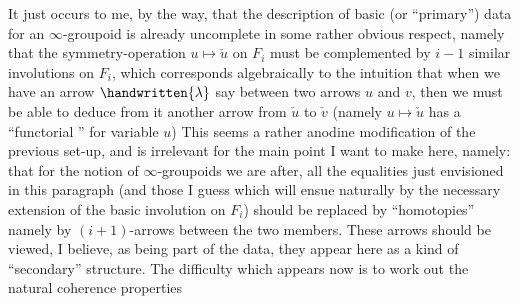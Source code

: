 It just occurs to me, by the way, that the  description of basic (or ``primary'') data for an $\infty$-groupoid is already uncomplete in some rather obvious respect, namely that the symmetry-operation  $u\mapsto\check{u}$ on $F_i$ must be complemented by $i-1$ similar involutions on $F_i$, which corresponds algebraically to the intuition that when we have an arrow $\handwritten{\lambda}$ say between two arrows $u$ and $v$, then we must be able to deduce from it another arrow from $\check{u}$ to $\check{v}$ (namely $u\mapsto\check{u}$ has a ``functorial ''  for variable $u$) This seems a rather anodine modification of the previous set-up, and is irrelevant for the main point I want to make here, namely: that for the notion of $\infty$-groupoids we are after, all the equalities just envisioned in this paragraph (and those I guess which will ensue naturally by the necessary extension of the basic involution on $F_i$) should be replaced by ``homotopies'' namely by $(i+1)$-arrows between the two members. These arrows should be viewed, I believe, as being part of the data,   they appear here as a kind of ``secondary'' structure. The difficulty which appears now is to work out the natural coherence properties
